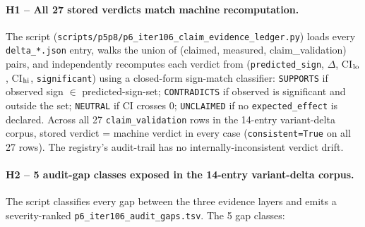 \paragraph{H1 -- All 27 stored verdicts match machine recomputation.}
The script (\texttt{scripts/p5p8/p6\_iter106\_claim\_evidence\_ledger.py})
loads every \texttt{delta\_*.json} entry, walks the union of (claimed,
measured, claim\_validation) pairs, and independently recomputes each verdict
from (\texttt{predicted\_sign}, $\Delta$, CI$_{\rm lo}$, CI$_{\rm hi}$,
\texttt{significant}) using a closed-form sign-match classifier:
\texttt{SUPPORTS} if observed sign $\in$ predicted-sign-set;
\texttt{CONTRADICTS} if observed is significant and outside the set;
\texttt{NEUTRAL} if CI crosses 0; \texttt{UNCLAIMED} if no
\texttt{expected\_effect} is declared. Across all 27
\texttt{claim\_validation} rows in the 14-entry variant-delta corpus,
stored verdict = machine verdict in every case (\texttt{consistent=True} on
all 27 rows). The registry's audit-trail has no internally-inconsistent
verdict drift.

\paragraph{H2 -- 5 audit-gap classes exposed in the 14-entry variant-delta corpus.}
The script classifies every gap between the three evidence layers and emits
a severity-ranked \texttt{p6\_iter106\_audit\_gaps.tsv}. The 5 gap classes:


